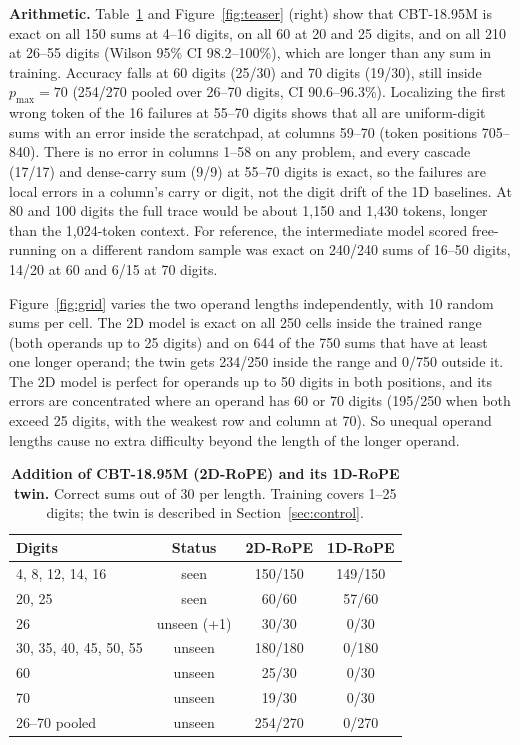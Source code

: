 \documentclass[10pt,twocolumn]{article}
\begin{document}
\textbf{Arithmetic.} Table~\ref{tab:cbtarith} and Figure~\ref{fig:teaser} (right) show that CBT-18.95M is exact on all 150 sums at 4--16 digits, on all 60 at 20 and 25 digits, and on all 210 at 26--55 digits (Wilson 95\% CI 98.2--100\%), which are longer than any sum in training. Accuracy falls at 60 digits (25/30) and 70 digits (19/30), still inside $p_{\max}=70$ (254/270 pooled over 26--70 digits, CI 90.6--96.3\%). Localizing the first wrong token of the 16 failures at 55--70 digits shows that all are uniform-digit sums with an error inside the scratchpad, at columns 59--70 (token positions 705--840). There is no error in columns 1--58 on any problem, and every cascade (17/17) and dense-carry sum (9/9) at 55--70 digits is exact, so the failures are local errors in a column's carry or digit, not the digit drift of the 1D baselines. At 80 and 100 digits the full trace would be about 1,150 and 1,430 tokens, longer than the 1,024-token context. For reference, the intermediate model scored free-running on a different random sample was exact on 240/240 sums of 16--50 digits, 14/20 at 60 and 6/15 at 70 digits.

Figure~\ref{fig:grid} varies the two operand lengths independently, with 10 random sums per cell. The 2D model is exact on all 250 cells inside the trained range (both operands up to 25 digits) and on 644 of the 750 sums that have at least one longer operand; the twin gets 234/250 inside the range and 0/750 outside it. The 2D model is perfect for operands up to 50 digits in both positions, and its errors are concentrated where an operand has 60 or 70 digits (195/250 when both exceed 25 digits, with the weakest row and column at 70). So unequal operand lengths cause no extra difficulty beyond the length of the longer operand.

\begin{table}[!t]
\centering
\footnotesize
\setlength{\tabcolsep}{4pt}
\caption{\textbf{Addition of CBT-18.95M (2D-RoPE) and its 1D-RoPE twin.} Correct sums out of 30 per length. Training covers 1--25 digits; the twin is described in Section~\ref{sec:control}.}\label{tab:cbtarith}
\begin{tabular}{@{}lccc@{}}
\toprule
Digits & Status & 2D-RoPE & 1D-RoPE \\
\midrule
4, 8, 12, 14, 16 & seen & 150/150 & 149/150 \\
20, 25 & seen & 60/60 & 57/60 \\
26 & unseen (+1) & 30/30 & 0/30 \\
30, 35, 40, 45, 50, 55 & unseen & 180/180 & 0/180 \\
60 & unseen & 25/30 & 0/30 \\
70 & unseen & 19/30 & 0/30 \\
\midrule
26--70 pooled & unseen & 254/270 & 0/270 \\
\bottomrule
\end{tabular}
\end{table}
\end{document}

